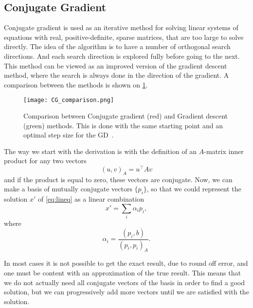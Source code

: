 \subsection{Conjugate Gradient}

Conjugate gradient is used as an iterative method for solving linear systems of equations with real, positive-definite, sparse matrices, that are too large to solve directly. The idea of the algorithm is to have a number of orthogonal search directions. And each search direction is explored fully before going to the next. This method can be viewed as an improved version of the gradient descent method, where the search is always done in the direction of the gradient. A comparison between the methods is shown on   \cref{fig:cg_comp}.
\begin{figure}[htbp]
    \centerline{\texttt{[image: CG\_comparison.png]}}
    \caption{Comparison between Conjugate gradient (red) and Gradient descent (green) methods. This is done with the same starting point and an optimal step size for the GD~\cite{pic-cg}.}
    \label{fig:cg_comp}
\end{figure}

The way we start with the derivation is with the definition of an $A$-matrix inner product for any two vectors
\begin{equation}
    \left( u, v \right)_A = u^\top A v
    \label{eq:cg_constraint}
\end{equation}
and if the product is equal to zero, these vectors are conjugate. Now, we can make a basis of mutually conjugate vectors $\{ p_i \}$, so that we could represent the solution $x'$ of \cref{eq:lineq} as a linear combination
\begin{equation}
    x' = \sum_i \alpha_i p_i,
\end{equation}
where
\begin{equation}
    \alpha_i = \frac{\left( p_i, b \right)}{\left( p_i, p_i \right)_A}.
\end{equation}

In most cases it is not possible to get the exact result, due to round off error, and one must be content with an approximation of the true result. This means that we do not actually need all conjugate vectors of the basis in order to find a good solution, but we can progressively add more vectors until we are satisfied with the solution.

